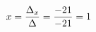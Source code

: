 \documentclass[preview]{standalone}
\begin{document}
\begin{align*}
\special{dvisvgm:raw <g id='unique000'>}x = \frac{\Delta_x}{\Delta} = \frac{-21}{-21} = 1\special{dvisvgm:raw </g>}
\end{align*}
\end{document}

